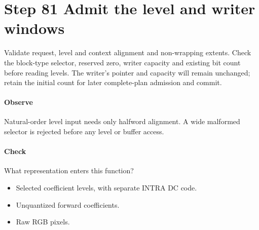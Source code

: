 \section{Step 81 Admit the level and writer windows}\label{h263-coeff-s01}
Validate request, level and context alignment and non-wrapping extents. Check the
block-type selector, reserved zero, writer capacity and existing bit count before
reading levels. The writer's pointer and capacity will remain unchanged; retain
the initial count for later complete-plan admission and commit.

\paragraph{Observe} Natural-order level input needs only halfword alignment.
A wide malformed selector is rejected before any level or buffer access.
\paragraph{Check} What representation enters this function?
\begin{itemize}
  \item[A.] Selected coefficient levels, with separate INTRA DC code.
  \item[B.] Unquantized forward coefficients.
  \item[C.] Raw RGB pixels.
\end{itemize}
